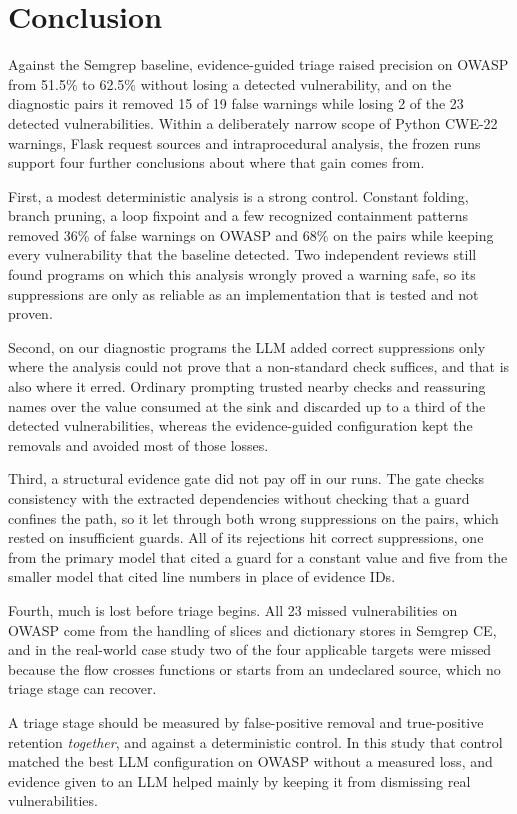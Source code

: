 \section{Conclusion}

Against the Semgrep baseline, evidence-guided triage raised precision on OWASP from 51.5\% to 62.5\% without losing a detected vulnerability, and on the diagnostic pairs it removed 15 of 19 false warnings while losing 2 of the 23 detected vulnerabilities. Within a deliberately narrow scope of Python CWE-22 warnings, Flask request sources and intraprocedural analysis, the frozen runs support four further conclusions about where that gain comes from.

First, a modest deterministic analysis is a strong control. Constant folding, branch pruning, a loop fixpoint and a few recognized containment patterns removed 36\% of false warnings on OWASP and 68\% on the pairs while keeping every vulnerability that the baseline detected. Two independent reviews still found programs on which this analysis wrongly proved a warning safe, so its suppressions are only as reliable as an implementation that is tested and not proven.

Second, on our diagnostic programs the LLM added correct suppressions only where the analysis could not prove that a non-standard check suffices, and that is also where it erred. Ordinary prompting trusted nearby checks and reassuring names over the value consumed at the sink and discarded up to a third of the detected vulnerabilities, whereas the evidence-guided configuration kept the removals and avoided most of those losses.

Third, a structural evidence gate did not pay off in our runs. The gate checks consistency with the extracted dependencies without checking that a guard confines the path, so it let through both wrong suppressions on the pairs, which rested on insufficient guards. All of its rejections hit correct suppressions, one from the primary model that cited a guard for a constant value and five from the smaller model that cited line numbers in place of evidence IDs.

Fourth, much is lost before triage begins. All 23 missed vulnerabilities on OWASP come from the handling of slices and dictionary stores in Semgrep CE, and in the real-world case study two of the four applicable targets were missed because the flow crosses functions or starts from an undeclared source, which no triage stage can recover.

A triage stage should be measured by false-positive removal and true-positive retention \emph{together}, and against a deterministic control. In this study that control matched the best LLM configuration on OWASP without a measured loss, and evidence given to an LLM helped mainly by keeping it from dismissing real vulnerabilities.
